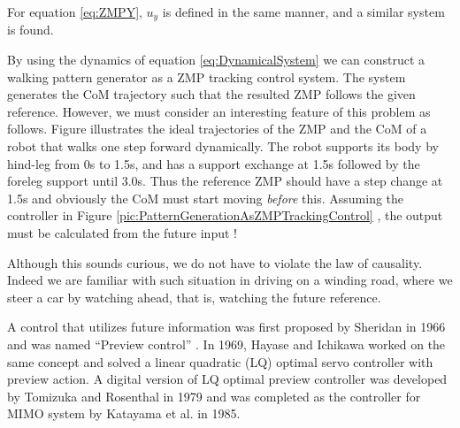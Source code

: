 %
For equation \ref{eq:ZMPY}, $u_y$ is defined in the same manner, and a similar system is found.
\par
By using the dynamics of equation \ref{eq:DynamicalSystem} we can construct a walking pattern
generator as a ZMP tracking control system. The system generates the CoM trajectory such
that the resulted ZMP follows the given reference.
However, we must consider an interesting feature of this problem as follows.
Figure
illustrates the ideal trajectories of the ZMP and the CoM of a robot that walks one step forward
dynamically. The robot supports its body by hind-leg from 0s to 1.5s, and has a support
exchange at 1.5s followed by the foreleg support until 3.0s. Thus the reference ZMP should have
a step change at 1.5s and obviously the CoM must start moving \textit{before} this.
Assuming the controller in Figure \ref{pic:PatternGenerationAsZMPTrackingControl} , the output must be calculated from the future input !
\par
Although this sounds curious, we do not have to violate the law of causality.
Indeed we are familiar with such situation in driving on a winding road, where we steer
a car by watching ahead, that is, watching the future reference.
\par
A control that utilizes future information was first proposed by Sheridan in 1966 and was named
``Preview control'' . In 1969, Hayase and Ichikawa worked on the same concept and solved
a linear quadratic (LQ) optimal servo controller with preview
action. A digital version of LQ optimal preview controller was developed
by Tomizuka and Rosenthal in 1979 and was completed as the controller
for MIMO system by Katayama et al. in 1985.
%
\clearpage
